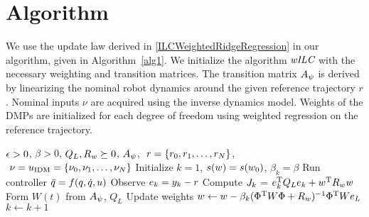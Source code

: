 \section{Algorithm}

We use the update law derived in \eqref{ILCWeightedRidgeRegression} in our algorithm, given in Algorithm~\ref{alg1}. We initialize the algorithm $\emph{wILC}$ with the necessary weighting and transition matrices. The transition matrix $A_{\psi}$ is derived by linearizing the nominal robot dynamics around the given reference trajectory $r$. Nominal inputs $\nu$ are acquired using the inverse dynamics model. Weights of the DMPs are initialized for each degree of freedom using weighted regression on the reference trajectory.


\begin{algorithm}[tb]
   \caption{\alg}
   \label{alg1}
\begin{algorithmic}
    $\epsilon > 0$, $\beta > 0$, $Q_L, R_{w} \succeq 0$, $A_{\psi}$, $\ \traj = \{\traj_0, \traj_1, \ldots, \traj_N \}$, $\ \nu = u_{\mathrm{IDM}} = \{\nu_0, \nu_1, \ldots, \nu_N \}$
   \STATE Initialize $k = 1$, $s(w) = s(w_0)$, $\beta_k = \beta$
   \REPEAT 
 	   \STATE Run controller $\ddot{q} = f(q,\dot{q},u)$ %
 	   \STATE Observe $e_k = y_k - r$
 	   \STATE Compute $J_k$ = $e_k^{\mathrm{T}}Q_Le_k + w^{\mathrm{T}}R_ww$
 	   \STATE Form $W(t)$ from $A_{\psi}$, $Q_L$
 	   \STATE Update weights $w \leftarrow w - \beta_k(\Phi^{\mathrm{T}}W\Phi + R_{w})^{-1}\Phi^{\mathrm{T}}We_L$
 	   \STATE $k \leftarrow k + 1$
\end{algorithmic}
\end{algorithm}